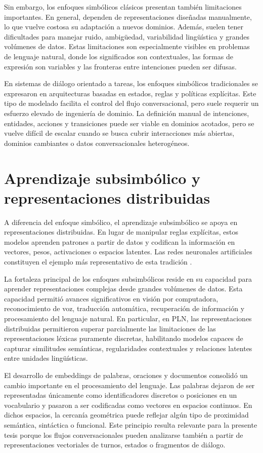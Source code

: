 Sin embargo, los enfoques simbólicos clásicos presentan también limitaciones
importantes. En general, dependen de representaciones diseñadas manualmente, lo que
vuelve costosa su adaptación a nuevos dominios. Además, suelen tener dificultades
para manejar ruido, ambigüedad, variabilidad lingüística y grandes volúmenes de datos.
Estas limitaciones son especialmente visibles en problemas de lenguaje natural, donde
los significados son contextuales, las formas de expresión son variables y las fronteras
entre intenciones pueden ser difusas.

En sistemas de diálogo orientado a tareas, los enfoques simbólicos tradicionales se
expresaron en arquitecturas basadas en estados, reglas y políticas explícitas. Este tipo
de modelado facilita el control del flujo conversacional, pero suele requerir un esfuerzo
elevado de ingeniería de dominio. La definición manual de intenciones, entidades,
acciones y transiciones puede ser viable en dominios acotados, pero se vuelve difícil de
escalar cuando se busca cubrir interacciones más abiertas, dominios cambiantes o datos
conversacionales heterogéneos.

\section{Aprendizaje subsimbólico y representaciones distribuidas}

A diferencia del enfoque simbólico, el aprendizaje subsimbólico se apoya en
representaciones distribuidas. En lugar de manipular reglas explícitas, estos modelos
aprenden patrones a partir de datos y codifican la información en vectores, pesos,
activaciones o espacios latentes. Las redes neuronales artificiales constituyen el ejemplo
más representativo de esta tradición \citep{rumelhart1986learning}.

La fortaleza principal de los enfoques subsimbólicos reside en su capacidad para
aprender representaciones complejas desde grandes volúmenes de datos. Esta capacidad
permitió avances significativos en visión por computadora, reconocimiento de voz,
traducción automática, recuperación de información y procesamiento del lenguaje
natural. En particular, en \ac{PLN}, las representaciones distribuidas permitieron superar
parcialmente las limitaciones de las representaciones léxicas puramente discretas,
habilitando modelos capaces de capturar similitudes semánticas, regularidades
contextuales y relaciones latentes entre unidades lingüísticas.

El desarrollo de embeddings de palabras, oraciones y documentos consolidó un cambio
importante en el procesamiento del lenguaje. Las palabras dejaron de ser representadas
únicamente como identificadores discretos o posiciones en un vocabulario y pasaron a
ser codificadas como vectores en espacios continuos. En dichos espacios, la cercanía
geométrica puede reflejar algún tipo de proximidad semántica, sintáctica o funcional.
Este principio resulta relevante para la presente tesis porque los flujos conversacionales
pueden analizarse también a partir de representaciones vectoriales de turnos, estados
o fragmentos de diálogo.

